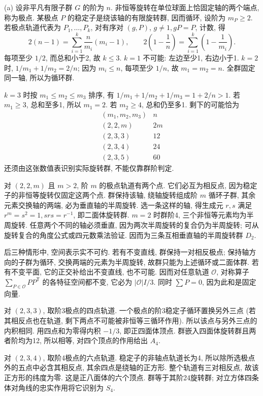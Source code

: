 \begin{solution}
(a) 设非平凡有限子群 $G$ 的阶为 $n$. 非恒等旋转在单位球面上恰固定轴的两个端点, 称为极点. 某极点 $P$ 的稳定子是绕该轴的有限旋转群, 因而循环, 设阶为 $m_P\ge2$. 若极点轨道代表为 $P_1,\ldots,P_k$, 对有序对 $(g,P)$, $g\ne1,gP=P$, 计数, 得
\[
 2(n-1)=\sum_{i=1}^k\frac n{m_i}(m_i-1),\qquad
 2\left(1-\frac1n\right)=\sum_{i=1}^k\left(1-\frac1{m_i}\right). \tag{H7.1}
\]
每项至少 $1/2$, 而总和小于2, 故 $k\le3$. $k=1$ 不可能: 左边至少1, 右边小于1. $k=2$ 时, $1/m_1+1/m_2=2/n$; 因为 $m_i\le n$, 每项至少 $1/n$, 故 $m_1=m_2=n$. 全群固定同一轴, 所以为循环群.

$k=3$ 时按 $m_1\le m_2\le m_3$ 排序, 有 $1/m_1+1/m_2+1/m_3=1+2/n>1$. 若 $m_1\ge3$, 总和至多1, 所以 $m_1=2$. 若 $m_2\ge4$, 总和仍至多1. 剩下的可能恰为
\[
\begin{array}{c|c}
(m_1,m_2,m_3)&n\\\hline
(2,2,m)&2m\\
(2,3,3)&12\\
(2,3,4)&24\\
(2,3,5)&60
\end{array}                                                     \tag{H7.2}
\]
还须由这张数值表识别实际旋转群, 不能仅靠群阶判定.

对 $(2,2,m)$ 且 $m>2$, 阶 $m$ 的极点轨道有两个点. 它们必互为相反点, 因为稳定子的非恒等旋转仅固定这两个点. 群保持该轴, 绕轴旋转组成阶 $m$ 循环子群, 其余元素交换轴的两端, 必为垂直轴的半周旋转. 选一条这样的轴, 得生成元 $r,s$ 满足 $r^m=s^2=1,srs=r^{-1}$, 即二面体旋转群. $m=2$ 时群阶4, 三个非恒等元素均为半周旋转. 任意两个不同的轴必须垂直, 因为两次半周旋转的复合仍为半周旋转; 可从旋转复合的角度公式或四元数乘法验证. 因而为三条互相垂直轴的半周旋转群 $D_2$.

后三种情形中, 空间表示实不可约. 若有不变直线, 群保持一对相反极点; 保持轴方向的子群为循环, 交换两端的元素为半周旋转, 故群只能为上述循环或二面体群. 若有不变平面, 它的正交补给出不变直线, 也不可能. 因而对任意轨道 $\mathcal O$, 对称算子 $\sum_{P\in\mathcal O}PP^{\mathsf T}$ 的各特征空间都不变, 它必为 $|\mathcal O|I/3$. 同时 $\sum P=0$, 因为此和是固定向量.

对 $(2,3,3)$, 取阶3极点的四点轨道. 一个极点的阶3稳定子循环置换另外三点 (若其相反点也在轨道, 剩下两点不可能被非恒等三循环作用). 所以该点与另外三点的内积相同. 用四点和为零得内积 $-1/3$, 即正四面体顶点. 群嵌入四面体旋转群且两者阶均为12, 所以相等, 对四个顶点的作用给出 $A_4$.

对 $(2,3,4)$, 取阶4极点的六点轨道. 稳定子的非轴点轨道长为4, 所以除所选极点外的五点中必含其相反点, 其余四点是绕轴的正方形. 整个轨道有三对相反点, 故该正方形的纬度为零. 这是正八面体的六个顶点. 群等于其阶24旋转群; 对立方体四条体对角线的忠实作用将它识别为 $S_4$.


\end{solution}
